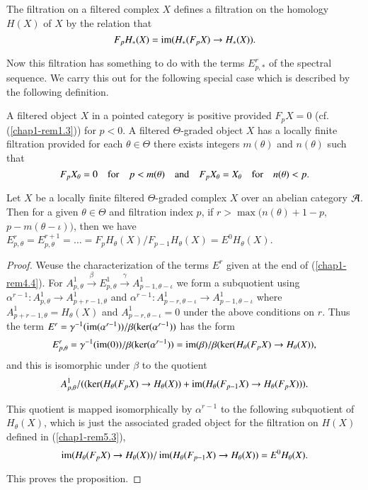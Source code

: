 \begin{remark}\label{chap1-rem5.3}
The filtration on a filtered complex $X$ defines a filtration on the
homology $H(X)$ of $X$ by the relation that
$$
F_{p}H_{\ast}(X)=\operatorname{im}(H_{\ast}(F_{p}X)\to H_{\ast}(X)).
$$

Now this filtration has something to do with the terms
$E^{r}_{p,\ast}$ of the spectral sequence. We carry this out for the
following special case which is described by the following
definition. 
\end{remark}

\begin{definition}\label{chap1-defi5.4} 
A filtered object $X$ in a pointed category is
positive provided 
$F_{p}X=0$ (cf. (\ref{chap1-rem1.3})) for $p<0$. A filtered
$\Theta$-graded object $X$ has a locally finite
filtration provided
for each $\theta\in\Theta$ there exists integers $m(\theta)$ and
$n(\theta)$ such that
$$
F_{p}X_{\theta}=0\quad\text{for}\quad p<m(\theta)\quad\text{and}\quad
  F_{p}X_{\theta}=X_{\theta}\quad\text{for}\quad n(\theta)<p.
$$
\end{definition}

\begin{proposition}\label{chap1-prop5.5}
Let $X$ be a locally finite filtered $\Theta$-graded complex $X$ over
an abelian category $\mathcal{A}$. Then for a given $\theta\in\Theta$ and
filtration index $p$, if $r>\max(n(\theta)+1-p$, $p-m(\theta-\iota))$,
then we have
$E^{r}_{p,\theta}=E^{r+1}_{p,\theta}=\ldots=F_{p}H_{\theta}(X)/F_{p-1}H_{\theta}(X)=E^{0}H_{\theta}(X)$. 
\end{proposition}

\begin{proof}
We\pageoriginale use the characterization of the terms $E^{r}$ given at the end of
(\ref{chap1-rem4.4}). For
$A^{1}_{p,\theta}\xrightarrow{\beta}E^{1}_{p,\theta}\xrightarrow{\gamma}A^{1}_{p-1,\theta-\iota}$
we form a subquotient using $\alpha^{r-1}:A^{1}_{p,\theta}\to
A^{1}_{p+r-1,\theta}$ and $\alpha^{r-1}:A^{1}_{p-r,\theta-\iota}\to
A^{1}_{p-1,\theta-\iota}$ where $A^{1}_{p+r-1,\theta}=H_{\theta}(X)$
and $A^{1}_{p-r,\theta-\iota}=0$ under the above conditions on
$r$. Thus the term
$E^{r}=\gamma^{-1}(\operatorname{im}(\alpha^{r-1}))/\beta(\ker(\alpha^{r-1}))$ has
the form
$$
E^{r}_{p,\theta}=\gamma^{-1}(\operatorname{im}(0))/\beta(\ker(\alpha^{r-1}))=\operatorname{im}(\beta)/\beta(\ker(H_{\theta}(F_{p}X)\to
H_{\theta}(X)), 
$$
and this is isomorphic under $\beta$ to the quotient 
$$
A^{1}_{p,\theta}/((\ker(H_{\theta}(F_{p}X)\to
H_{\theta}(X))+\operatorname{im}(H_{\theta}(F_{p-1}X)\to H_{\theta}(F_{p}X))). 
$$

This quotient is mapped isomorphically by $\alpha^{r-1}$ to the
following subquotient of $H_{\theta}(X)$, which is just the associated
graded object for the filtration on $H(X)$ defined in
(\ref{chap1-rem5.3}), 
$$
\operatorname{im}(H_{\theta}(F_{p}X)\to H_{\theta}(X))/\operatorname{im}(H_{\theta}(F_{p-1}X)\to
H_{\theta}(X))=E^{0}H_{\theta}(X). 
$$

This proves the proposition.
\end{proof}

